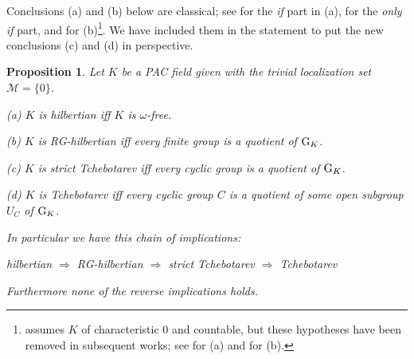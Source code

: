 \documentclass[12pt,english]{amsart}
\newtheorem{twisting lemma}[theorem]{Twisting lemma}
\newtheorem{proposition}[theorem]{Proposition}
\begin{document}
Conclusions (a) and (b) below are classical; see \cite[corollary 27.3.3]{FrJa} for the {\it if} part in (a), 
\cite[theorem A]{FV92} for the {\it only if} part, and \cite[theorem B]{FV92} for (b)\footnote{ \cite{FV92} assumes $K$ of characteristic $0$ and countable, but these hypotheses have been removed in subsequent works; see \cite{PopLarge} for (a) and  \cite[\S 3.3]{DeBB} for (b).}. We have included them in the statement to put the new conclusions (c) and (d) in perspective.

\begin{proposition} \label{prop:compare-for-PAC}
 Let $K$ be a PAC field given with the trivial localization set ${\mathcal M}=\{0\}$.
\vskip 1mm

\noindent
{\rm (a)} $K$ is hilbertian iff $K$ is $\omega$-free.
\vskip 1mm

\noindent
{\rm (b)} $K$ is RG-hilbertian iff every finite group is a quotient of ${\hbox{\rm G}}_K$.
\vskip 1mm

\noindent
{\rm (c)} $K$ is strict Tchebotarev iff every cyclic group is a quotient of ${\hbox{\rm G}}_K$.
\vskip 1mm

\noindent
{\rm (d)} $K$ is Tchebotarev iff every cyclic group $C$ is a quotient of some open subgroup $U_C$ of ${\hbox{\rm G}}_K$.
\vskip 1mm

\noindent
In particular we have this chain of implications:
\vskip 1mm

\noindent
\centerline{{\rm hilbertian} $\Rightarrow$ {\rm RG-hilbertian} $\Rightarrow$ {\rm strict Tchebotarev} $\Rightarrow$ {\rm Tchebotarev} }
\vskip 1mm

\noindent
Furthermore none of the reverse implications holds.
\end{proposition}
\end{document}
